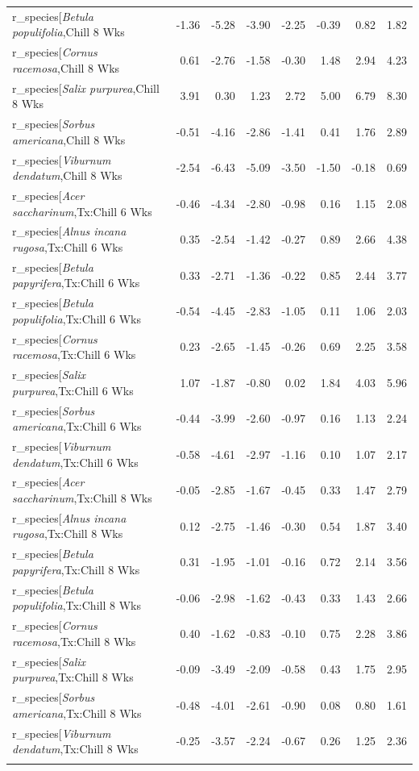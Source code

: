 \documentclass{article}\usepackage[]{graphicx}\usepackage[]{color}
\begin{document}
\begin{longtable}{lrrrrrrr}
  r_species[\textit{Betula populifolia},Chill 8 Wks & -1.36 & -5.28 & -3.90 & -2.25 & -0.39 & 0.82 & 1.82 \\ 
  r_species[\textit{Cornus racemosa},Chill 8 Wks & 0.61 & -2.76 & -1.58 & -0.30 & 1.48 & 2.94 & 4.23 \\ 
  r_species[\textit{Salix purpurea},Chill 8 Wks & 3.91 & 0.30 & 1.23 & 2.72 & 5.00 & 6.79 & 8.30 \\ 
  r_species[\textit{Sorbus americana},Chill 8 Wks & -0.51 & -4.16 & -2.86 & -1.41 & 0.41 & 1.76 & 2.89 \\ 
  r_species[\textit{Viburnum dendatum},Chill 8 Wks & -2.54 & -6.43 & -5.09 & -3.50 & -1.50 & -0.18 & 0.69 \\ 
  r_species[\textit{Acer saccharinum},Tx:Chill 6 Wks & -0.46 & -4.34 & -2.80 & -0.98 & 0.16 & 1.15 & 2.08 \\ 
  r_species[\textit{Alnus incana rugosa},Tx:Chill 6 Wks & 0.35 & -2.54 & -1.42 & -0.27 & 0.89 & 2.66 & 4.38 \\ 
  r_species[\textit{Betula papyrifera},Tx:Chill 6 Wks & 0.33 & -2.71 & -1.36 & -0.22 & 0.85 & 2.44 & 3.77 \\ 
  r_species[\textit{Betula populifolia},Tx:Chill 6 Wks & -0.54 & -4.45 & -2.83 & -1.05 & 0.11 & 1.06 & 2.03 \\ 
  r_species[\textit{Cornus racemosa},Tx:Chill 6 Wks & 0.23 & -2.65 & -1.45 & -0.26 & 0.69 & 2.25 & 3.58 \\ 
  r_species[\textit{Salix purpurea},Tx:Chill 6 Wks & 1.07 & -1.87 & -0.80 & 0.02 & 1.84 & 4.03 & 5.96 \\ 
  r_species[\textit{Sorbus americana},Tx:Chill 6 Wks & -0.44 & -3.99 & -2.60 & -0.97 & 0.16 & 1.13 & 2.24 \\ 
  r_species[\textit{Viburnum dendatum},Tx:Chill 6 Wks & -0.58 & -4.61 & -2.97 & -1.16 & 0.10 & 1.07 & 2.17 \\ 
  r_species[\textit{Acer saccharinum},Tx:Chill 8 Wks & -0.05 & -2.85 & -1.67 & -0.45 & 0.33 & 1.47 & 2.79 \\ 
  r_species[\textit{Alnus incana rugosa},Tx:Chill 8 Wks & 0.12 & -2.75 & -1.46 & -0.30 & 0.54 & 1.87 & 3.40 \\ 
  r_species[\textit{Betula papyrifera},Tx:Chill 8 Wks & 0.31 & -1.95 & -1.01 & -0.16 & 0.72 & 2.14 & 3.56 \\ 
  r_species[\textit{Betula populifolia},Tx:Chill 8 Wks & -0.06 & -2.98 & -1.62 & -0.43 & 0.33 & 1.43 & 2.66 \\ 
  r_species[\textit{Cornus racemosa},Tx:Chill 8 Wks & 0.40 & -1.62 & -0.83 & -0.10 & 0.75 & 2.28 & 3.86 \\ 
  r_species[\textit{Salix purpurea},Tx:Chill 8 Wks & -0.09 & -3.49 & -2.09 & -0.58 & 0.43 & 1.75 & 2.95 \\ 
  r_species[\textit{Sorbus americana},Tx:Chill 8 Wks & -0.48 & -4.01 & -2.61 & -0.90 & 0.08 & 0.80 & 1.61 \\ 
  r_species[\textit{Viburnum dendatum},Tx:Chill 8 Wks & -0.25 & -3.57 & -2.24 & -0.67 & 0.26 & 1.25 & 2.36 \\ 
   \hline
\hline
\label{tab:suppmoddvr}
\end{longtable}
\end{document}
